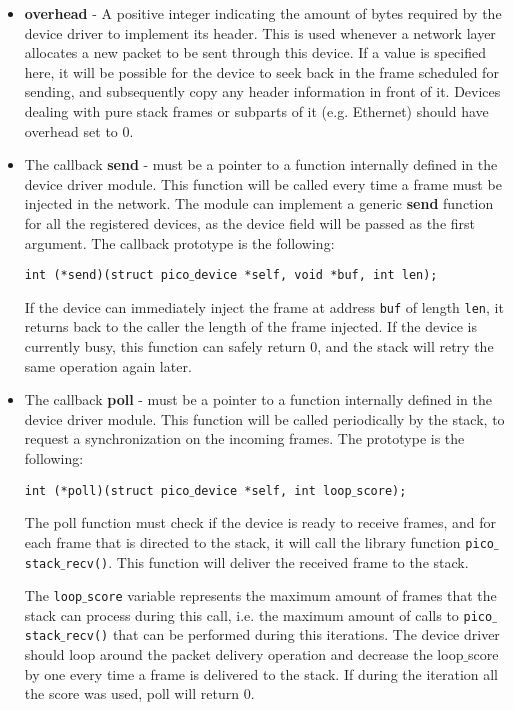 \begin{itemize}
\item \textbf{overhead} - A positive integer indicating the amount of bytes required by the
device driver to implement its header. This is used whenever a network layer allocates a new
packet to be sent through this device. If a value is specified here, it will be possible for
the device to seek back in the frame scheduled for sending, and subsequently copy any header
information in front of it. Devices dealing with pure stack frames or subparts of it
(e.g. Ethernet) should have overhead set to 0.

\item The callback \textbf{send} - must be a pointer to a function internally defined in the
device driver module. This function will be called every time a frame must be injected in the
network. The module can implement a generic \textbf{send} function for all the registered devices, as
the device field will be passed as the first argument. The callback prototype is the following:

 \texttt{int (*send)(struct pico$\_$device *self, void *buf, int len);}

If the device can immediately inject the frame at address \texttt{buf} of length \texttt{len},
it returns back to the caller the length of the frame injected. If the device is currently busy,
this function can safely return 0, and the stack will retry the same operation again later.

\item The callback \textbf{poll} - must be a pointer to a function internally defined in the
device driver module. This function will be called periodically by the stack, to request a
synchronization on the incoming frames. The prototype is the following:

  \texttt{int (*poll)(struct pico$\_$device *self, int loop$\_$score);}

The poll function must check if the device is ready to receive frames, and for each frame that
is directed to the stack, it will call the library function \texttt{pico$\_$stack$\_$recv()}.
This function will deliver the received frame to the stack.

The \texttt{loop$\_$score} variable represents the maximum amount of frames that the stack can process
during this call, i.e. the maximum amount of calls to \texttt{pico$\_$stack$\_$recv()} that
can be performed during this iterations. The device driver should loop around the packet
delivery operation and decrease the loop$\_$score by one every time a frame is delivered to
the stack. If during the iteration all the score was used, poll will return 0.


\end{itemize}
